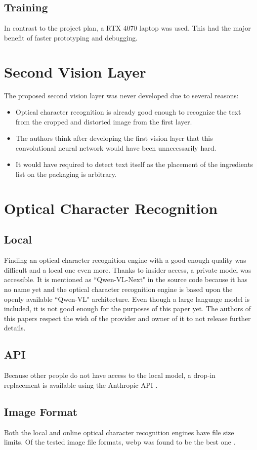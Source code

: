 \documentclass[a4paper,11pt]{report}
\begin{document}
        \section{Training}
            In contrast to the project plan, a RTX 4070 laptop was used. This had the major benefit of faster prototyping and debugging.
    
    \chapter{Second Vision Layer}
        The proposed second vision layer was never developed due to several reasons:
        \begin{itemize}
            \item Optical character recognition is already good enough to recognize the text from the cropped and distorted image from the first layer.
            \item The authors think after developing the first vision layer that this convolutional neural network would have been unnecessarily hard.
            \item It would have required to detect text itself as the placement of the ingredients list on the packaging is arbitrary.
        \end{itemize}
      
      
     \chapter{Optical Character Recognition}
     
        \section{Local}
            Finding an optical character recognition engine with a good enough quality was difficult and a local one even more. Thanks to insider access, a private model was accessible. It is mentioned as ``Qwen-VL-Next" in the source code because it has no name yet and the optical character recognition engine is based upon the openly available ``Qwen-VL" architecture. Even though a large language model is included, it is not good enough for the purposes of this paper yet. The authors of this papers respect the wish of the provider and owner of it to not release further details.
            
        \section{API}
            Because other people do not have access to the local model, a drop-in replacement is available using the Anthropic API \cite{claude3-5sonnet}.
            
            
        \section{Image Format}
            Both the local and online optical character recognition engines have file size limits. Of the tested image file formats, webp was found to be the best one \cite{zern-webp-15} \cite{dornauer2023webimageformatsassessment}.


    \printbibliography
\end{document}
